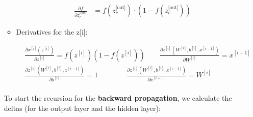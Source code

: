 \documentclass[12pt]{article}
\begin{document}
\begin{enumerate}
\begin{itemize}
    \begin{equation*}
        \begin{aligned}
            \frac{\partial f}{\partial z_c^\text{[out]}} &= f(z_c^\text{[out]}) \cdot (1 - f(z_c^\text{[out]}))
        \end{aligned}
    \end{equation*}

    \item Derivatives for the z[i]:
    
    \begin{equation*}
        \begin{aligned}
            &\frac{\partial x^{[i]}(z^{[i]})}{\partial z^{[i]}} = f(z^{[i]})(1 - f(z^{[i]})) \qquad \frac{\partial z^{[i]}(W^{[i]}, b^{[i]}, x^{[i-1]})}{\partial W^{[i]}} = x^{[i-1]}\\
            &\frac{\partial z^{[i]}(W^{[i]}, b^{[i]}, x^{[i-1]})}{\partial b^{[i]}} = 1 \qquad \quad \quad \frac{\partial z^{[i]}(W^{[i]}, b^{[i]}, x^{[i-1]})}{\partial x^{[i-1]}} = W^{[i]}\\
        \end{aligned}
    \end{equation*}

\end{itemize}

\vspace{10pt}
To start the recursion for the \textbf{backward propagation}, we calculate the deltas (for the output layer and the hidden layer):


\end{enumerate}
\end{document}
